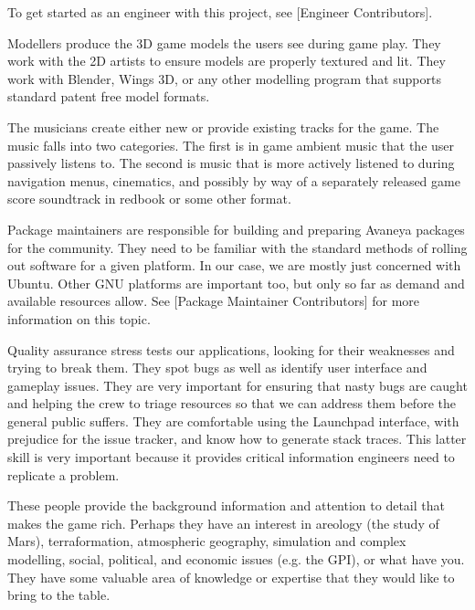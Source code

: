 To get started as an engineer with this project, see [Engineer Contributors].


Modellers produce the 3D game models the users see during game play. They work with the 2D artists to ensure models are properly textured and lit. They work with Blender, Wings 3D, or any other modelling program that supports standard patent free model formats.


The musicians create either new or provide existing tracks for the game. The music falls into two categories. The first is in game ambient music that the user passively listens to. The second is music that is more actively listened to during navigation menus, cinematics, and possibly by way of a separately released game score soundtrack in redbook or some other format.


Package maintainers are responsible for building and preparing Avaneya packages for the community. They need to be familiar with the standard methods of rolling out software for a given platform. In our case, we are mostly just concerned with Ubuntu. Other GNU platforms are important too, but only so far as demand and available resources allow. See [Package Maintainer Contributors] for more information on this topic.


Quality assurance stress tests our applications, looking for their weaknesses and trying to break them. They spot bugs as well as identify user interface and gameplay issues. They are very important for ensuring that nasty bugs are caught and helping the crew to triage resources so that we can address them before the general public suffers. They are comfortable using the Launchpad interface, with prejudice for the issue tracker, and know how to generate stack traces. This latter skill is very important because it provides critical information engineers need to replicate a problem.


These people provide the background information and attention to detail that makes the game rich. Perhaps they have an interest in areology (the study of Mars), terraformation, atmospheric geography, simulation and complex modelling, social, political, and economic issues (e.g. the GPI), or what have you. They have some valuable area of knowledge or expertise that they would like to bring to the table.

